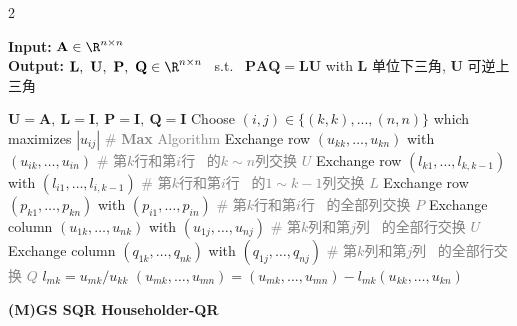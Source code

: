\documentclass{note}
\newcommand{\codealg}[1]{\textcolor{gray}{\quad \# \textbf{#1} Algorithm}}
\begin{document}
\begin{multicols}{2}
\begin{algorithm}[H]
\tiny
\caption*{\textbf{LUCP} LU factorisation with complete pivoting \ps{(not unique)} \vspace{-0.1cm} \quad \ps{$C(n)=n^3+n^2-2n$}}
\textbf{Input:} $\mathbf{A}\in\R^{n\times n}$ \\
\textbf{Output:} $\mathbf{L},\ \mathbf{U},\ \mathbf{P},\ \mathbf{Q}\in\R^{n\times n}$ \ s.t. \ $\mathbf{P}\mathbf{A}\mathbf{Q}=\mathbf{L}\mathbf{U}$ with $\mathbf{L}$ 单位下三角, $\mathbf{U}$ 可逆上三角
\begin{algorithmic}[1]
  \State $\mathbf{U} = \mathbf{A},\ \mathbf{L} = \mathbf{I},\ \mathbf{P} = \mathbf{I},\ \mathbf{Q} = \mathbf{I}$
    \State Choose $(i,j)\in\{(k,k),...,(n,n)\}$ which maximizes $|u_{ij}|$ \codealg{Max}
    \State Exchange row $(u_{k k}, \dots, u_{k n})$ with $(u_{i k}, \dots, u_{i n})$ \textcolor{gray}{\quad \# 第$k$行和第$i$行 \ 的$k\sim n$列交换 $U$}
    \State Exchange row $(l_{k1}, \dots, l_{k,k-1})$ with $(l_{i1}, \dots, l_{i,k-1})$ \textcolor{gray}{\quad \# 第$k$行和第$i$行 \ 的$1\sim k-1$列交换 $L$}
    \State Exchange row $(p_{k1}, \dots, p_{kn})$ with $(p_{i1}, \dots, p_{in})$ \textcolor{gray}{\quad \# 第$k$行和第$i$行 \ 的全部列交换 $P$}
    \State Exchange column $(u_{1 k}, \dots, u_{n k})$ with $(u_{1 j}, \dots, u_{n j})$ \textcolor{gray}{\quad \# 第$k$列和第$j$列 \ 的全部行交换 $U$}
    \State Exchange column $(q_{1 k}, \dots, q_{n k})$ with $(q_{1 j}, \dots, q_{n j})$ \textcolor{gray}{\quad \# 第$k$列和第$j$列 \ 的全部行交换 $Q$}
      \State $l_{m k} = u_{m k} / u_{k k}$
      \State $(u_{m k}, \dots, u_{m n}) = (u_{m k}, \dots, u_{m n}) - l_{m k}(u_{k k}, \dots, u_{k n})$
    \EndFor
  \EndFor
\end{algorithmic}
\end{algorithm}

\end{multicols}
\vspace{-30pt}


\textbf{(M)GS SQR Householder-QR}

\vspace{-9pt}
\end{document}
